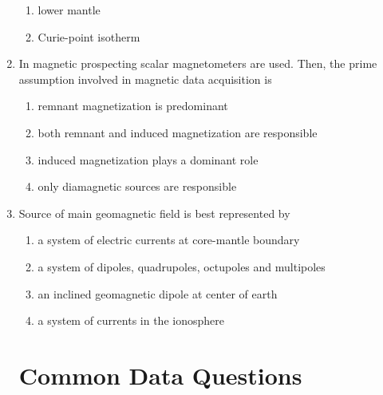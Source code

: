 \documentclass[12pt,fleqn]{article}
\theoremstyle{remark}
\begin{document}
\begin{enumerate}[label=Q.\arabic*.,font=\bfseries, start = 21]
\begin{enumerate}
                \item lower mantle
                \item Curie-point isotherm                
            \end{enumerate}
    \item In magnetic prospecting scalar magnetometers are used. Then, the prime assumption involved in magnetic data acquisition is \hfill{} 
            \begin{enumerate}
                \item remnant magnetization is predominant
                \item both remnant and induced magnetization are responsible
                \item induced magnetization plays a dominant role
                \item only diamagnetic sources are responsible                 
            \end{enumerate}
    \item Source of main geomagnetic field is best represented by \hfill{} 
            \begin{enumerate}
                \item a system of electric currents at core-mantle boundary
                \item a system of dipoles, quadrupoles, octupoles and multipoles
                \item an inclined geomagnetic dipole at center of earth
                \item a system of currents in the ionosphere                
            \end{enumerate}
    \section*{Common Data Questions}

\end{enumerate}
\end{document}
